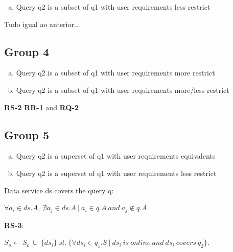 \begin{enumerate}[b)]
\item Query q2 is a subset of q1 with user requirements less restrict
\end{enumerate}

\begin{definition}
Tudo igual ao anterior...
\end{definition}

\subsection{Group 4}

\begin{enumerate}[a)]
\item Query q2 is a subset of q1 with user requirements more restrict
\item Query q2 is a subset of q1 with user requirements more/less restrict
\end{enumerate}

\begin{definition}
\textbf{RS-2} \textbf{RR-1} and \textbf{RQ-2}
\end{definition}

\subsection{Group 5}
\begin{enumerate}[a)]
\item Query q2 is a superset of q1 with user requirements equivalents
\item Query q2 is a superset of q1 with user requirements less restrict
\end{enumerate}

\begin{definition}
Data service ds covers the query q: 
\begin{center}
$ \forall a_{i} \in ds.A,\ \nexists a_{j} \in ds.A \ \vert \ a_{i} \in q.A\ and\ a_{j} \notin q.A$
\end{center}
\end{definition}

\begin{definition}
\textbf{RS-3}:
\begin{flushleft}
$ S_{o} \leftarrow S_{o} \ \cup \ \lbrace ds_{i} \rbrace\  st.\ \lbrace \forall ds_{i} \in q_{1}.S\ \vert \ ds_{i} \ is \ online\ and\ ds_{i}\ covers\ q_{2} \rbrace$. \\
\end{flushleft}
\end{definition}

